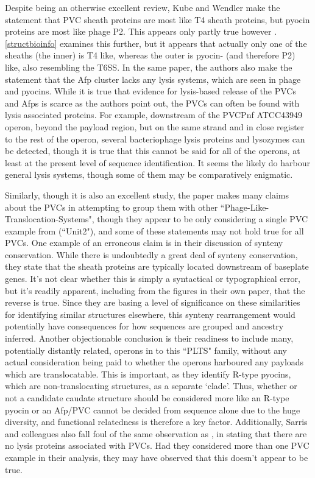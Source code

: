 Despite being an otherwise excellent review, Kube and Wendler make the statement that  PVC sheath proteins are most like T4 sheath proteins, but pyocin proteins are most like phage P2. This appears only partly true however \citep{Kube2015}. \vref{structbioinfo} examines this further, but it appears that actually only one of the sheaths (the inner) is T4 like, whereas the outer is pyocin- (and therefore P2) like, also resembling the T6SS. In the same paper, the authors also make the statement that the Afp cluster lacks any lysis systems, which are seen in phage and pyocins. While it is true that evidence for lysis-based release of the PVCs and Afps is scarce as the authors point out, the PVCs can often be found with lysis associated proteins. For example, downstream of the PVCPnf ATCC43949 operon, beyond the payload region, but on the same strand and in close register to the rest of the operon, several bacteriophage lysis proteins and lysozymes can be detected, though it is true that this cannot be said for all of the operons, at least at the present level of sequence identification. It seems the likely do harbour general lysis systems, though some of them may be comparatively enigmatic.

Similarly, though it is also an excellent study, the \cite{Sarris2014} paper makes many claims about the PVCs in attempting to group them with other ``Phage-Like-Translocation-Systems", though they appear to be only considering a single PVC example from \Plum{} (``Unit2"), and some of these statements may not hold true for all PVCs. One example of an erroneous claim is in their discussion of synteny conservation. While there is undoubtedly a great deal of synteny conservation, they state that the sheath proteins are typically located downstream of baseplate genes. It's not clear whether this is simply a syntactical or typographical error, but it's readily apparent, including from the figures in their own paper, that the reverse is true. Since they are basing a level of significance on these similarities for identifying similar structures elsewhere, this synteny rearrangement would potentially have consequences for how sequences are grouped and ancestry inferred. Another objectionable conclusion is their readiness to include many, potentially distantly related, operons in to this ``PLTS" family, without any actual consideration being paid to whether the operons harboured any payloads which are translocatable. This is important, as they identify R-type pyocins, which are non-translocating structures, as a separate `clade'. Thus, whether or not a candidate caudate structure should be considered more like an R-type pyocin or an Afp/PVC cannot be decided from sequence alone due to the huge diversity, and functional relatedness is therefore a key factor. Additionally, Sarris and colleagues also fall foul of the same observation as \cite{Kube2015}, in stating that there are no lysis proteins associated with PVCs. Had they considered more than one PVC example in their analysis, they may have observed that this doesn't appear to be true.

